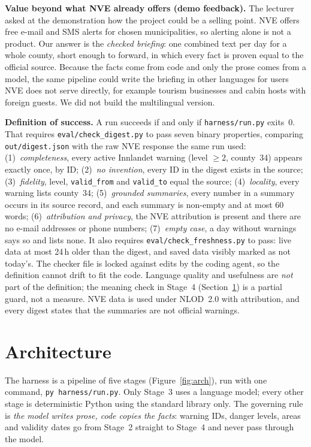 \documentclass{article}
\newcommand{\code}[1]{\texttt{#1}}
\begin{document}
\textbf{Value beyond what NVE already offers (demo feedback).} The lecturer asked at the demonstration how the project could be a selling point. NVE offers free e-mail and SMS alerts for chosen municipalities, so alerting alone is not a product. Our answer is the \emph{checked briefing}: one combined text per day for a whole county, short enough to forward, in which every fact is proven equal to the official source. Because the facts come from code and only the prose comes from a model, the same pipeline could write the briefing in other languages for users NVE does not serve directly, for example tourism businesses and cabin hosts with foreign guests. We did not build the multilingual version.

\textbf{Definition of success.} A run succeeds if and only if \code{harness/run.py} exits~0. That requires \code{eval/check\_digest.py} to pass seven binary properties, comparing \code{out/digest.json} with the raw NVE response the same run used:
(1)~\emph{completeness}, every active Innlandet warning (level $\geq 2$, county~34) appears exactly once, by ID;
(2)~\emph{no invention}, every ID in the digest exists in the source;
(3)~\emph{fidelity}, level, \code{valid\_from} and \code{valid\_to} equal the source;
(4)~\emph{locality}, every warning lists county~34;
(5)~\emph{grounded summaries}, every number in a summary occurs in its source record, and each summary is non-empty and at most 60 words;
(6)~\emph{attribution and privacy}, the NVE attribution is present and there are no e-mail addresses or phone numbers;
(7)~\emph{empty case}, a day without warnings says so and lists none.
It also requires \code{eval/check\_freshness.py} to pass: live data at most 24\,h older than the digest, and saved data visibly marked as not today's. The checker file is locked against edits by the coding agent, so the definition cannot drift to fit the code. Language quality and usefulness are \emph{not} part of the definition; the meaning check in Stage~4 (Section~\ref{sec:arch}) is a partial guard, not a measure. NVE data is used under NLOD~2.0 with attribution, and every digest states that the summaries are not official warnings.

\section{Architecture}
\label{sec:arch}

The harness is a pipeline of five stages (Figure~\ref{fig:arch}), run with one command, \code{py harness/run.py}. Only Stage~3 uses a language model; every other stage is deterministic Python using the standard library only. The governing rule is \emph{the model writes prose, code copies the facts}: warning IDs, danger levels, areas and validity dates go from Stage~2 straight to Stage~4 and never pass through the model.
\end{document}
